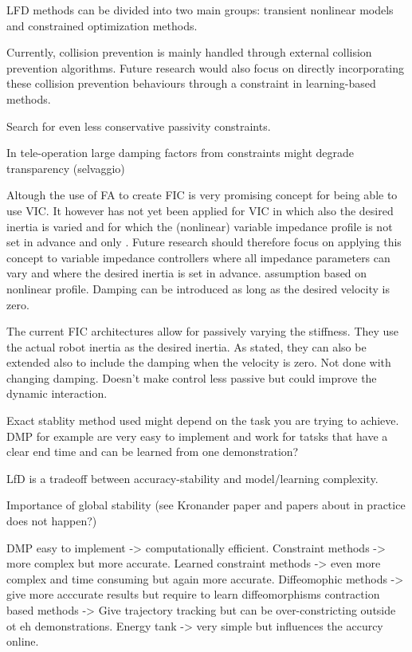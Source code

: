LFD methods can be divided into two main groups: transient nonlinear models and constrained optimization methods.


Currently, collision prevention is mainly handled through external collision prevention algorithms. Future research would also focus on directly incorporating these collision prevention behaviours through a constraint in learning-based methods.


Search for even less conservative passivity constraints.


In tele-operation large damping factors from constraints might degrade transparency (selvaggio)


Altough the use of FA to create FIC is very promising concept for being able to use VIC. It however has not yet been applied for VIC in which also the desired inertia is varied and for which the (nonlinear) variable impedance profile is not set in advance and only . Future research should therefore focus on applying this concept to variable impedance controllers where all impedance parameters can vary and where the desired inertia is set in advance. assumption based on nonlinear profile.
Damping can be introduced as long as the desired velocity is zero.

The current FIC architectures allow for passively varying the stiffness. They use the actual robot inertia as the desired inertia. As stated, they can also be extended also to include the damping when the velocity is zero.
Not done with changing damping. Doesn't make control less passive but could improve the dynamic interaction.


Exact stablity method used might depend on the task you are trying to achieve. DMP for example are very easy to implement and work for tatsks that have a clear end time and can be learned from one demonstration?

LfD is a tradeoff between accuracy-stability and model/learning complexity.

Importance of global stability (see Kronander paper and papers about in practice does not happen?)


DMP easy to implement -> computationally efficient.
Constraint methods -> more complex but more accurate.
Learned constraint methods -> even more complex and time consuming but again more accurate.
Diffeomophic methods -> give more acccurate results but require to learn diffeomorphisms
contraction based methods -> Give trajectory tracking but can be over-constricting outside ot eh demonstrations.
Energy tank -> very simple but influences the accurcy online.

